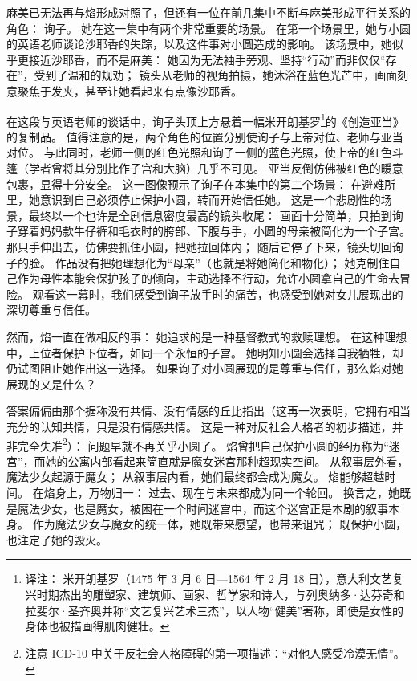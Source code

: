 麻美已无法再与焰形成对照了，但还有一位在前几集中不断与麻美形成平行关系的角色：
询子。
她在这一集中有两个非常重要的场景。
在第一个场景里，她与小圆的英语老师谈论沙耶香的失踪，以及这件事对小圆造成的影响。
该场景中，她似乎更接近沙耶香，而不是麻美：
她因为无法袖手旁观、坚持“行动”而非仅仅“存在”，受到了温和的规劝；
镜头从老师的视角拍摄，她沐浴在蓝色光芒中，画面刻意聚焦于发夹，甚至让她看起来有点像沙耶香。

在这段与英语老师的谈话中，询子头顶上方悬着一幅米开朗基罗\footnote{%
    译注：
    米开朗基罗（1475 年 3 月 6 日—1564 年 2 月 18 日），意大利文艺复兴时期杰出的雕塑家、建筑师、画家、哲学家和诗人，与列奥纳多·达芬奇和拉斐尔·圣齐奥并称“文艺复兴艺术三杰”，以人物“健美”著称，即使是女性的身体也被描画得肌肉健壮。
}的《创造亚当》的复制品。
值得注意的是，两个角色的位置分别使询子与上帝对位、老师与亚当对位。
与此同时，老师一侧的红色光照和询子一侧的蓝色光照，使上帝的红色斗篷（学者曾将其分别比作子宫\cite{stokes1955michelangelo}和大脑\cite{meshberger1990creation-adam}）几乎不可见。
亚当反倒仿佛被红色的暖意包裹，显得十分安全。
这一图像预示了询子在本集中的第二个场景：
在避难所里，她意识到自己必须停止保护小圆，转而开始信任她。
这是一个悲剧性的场景，最终以一个也许是全剧信息密度最高的镜头收尾：
画面十分简单，只拍到询子穿着妈妈款牛仔裤和毛衣时的胯部、下腹与手，小圆的母亲被简化为一个子宫。
那只手伸出去，仿佛要抓住小圆，把她拉回体内；
随后它停了下来，镜头切回询子的脸。
作品没有把她理想化为“母亲”（也就是将她简化和物化）；
她克制住自己作为母性本能会保护孩子的倾向，主动选择不行动，允许小圆拿自己的生命去冒险。
观看这一幕时，我们感受到询子放手时的痛苦，也感受到她对女儿展现出的深切尊重与信任。

然而，焰一直在做相反的事：
她追求的是一种基督教式的救赎理想。
在这种理想中，上位者保护下位者，如同一个永恒的子宫。
她明知小圆会选择自我牺牲，却仍试图阻止她作出这一选择。
如果询子对小圆展现的是尊重与信任，那么焰对她展现的又是什么？

答案偏偏由那个据称没有共情、没有情感的丘比指出（这再一次表明，它拥有相当充分的认知共情，只是没有情感共情。
这是一种对反社会人格者的初步描述，并非完全失准\footnote{%
    注意 ICD-10 中关于反社会人格障碍的第一项描述：“对他人感受冷漠无情”。
}\cite{who1994icd10}）：
问题早就不再关乎小圆了。
焰曾把自己保护小圆的经历称为“迷宫”，而她的公寓内部看起来简直就是魔女迷宫那种超现实空间。
从叙事层外看，魔法少女起源于魔女；
从叙事层内看，她们最终都会成为魔女。
焰能够超越时间。
在焰身上，万物归一：
过去、现在与未来都成为同一个轮回。
换言之，她既是魔法少女，也是魔女，被困在一个时间迷宫中，而这个迷宫正是本剧的叙事本身。
作为魔法少女与魔女的统一体，她既带来愿望，也带来诅咒；
既保护小圆，也注定了她的毁灭。

